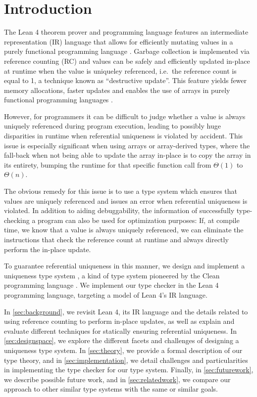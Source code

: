 \chapter{Introduction}\label{sec:intro}

The Lean 4 theorem prover and programming language \citep{de_moura_lean_2021} features an intermediate representation (IR) language that allows for efficiently mutating values in a purely functional programming language \citep{ullrich_counting_2020}. Garbage collection is implemented via reference counting (RC) and values can be safely and efficiently updated in-place at runtime when the value is uniqueley referenced, i.e.\ the reference count is equal to 1, a technique known as ``destructive update''. This feature yields fewer memory allocations, faster updates and enables the use of arrays in purely functional programming languages \citep{ullrich_counting_2020}.

However, for programmers it can be difficult to judge whether a value is always uniquely referenced during program execution, leading to possibly huge disparities in runtime when referential uniqueness is violated by accident. This issue is especially significant when using arrays or array-derived types, where the fall-back when not being able to update the array in-place is to copy the array in its entirety, bumping the runtime for that specific function call from $\Theta(1)$ to $\Theta(n)$.

The obvious remedy for this issue is to use a type system which ensures that values are uniquely referenced and issues an error when referential uniqueness is violated. In addition to aiding debuggability, the information of successfully type-checking a program can also be used for optimization purposes: If, at compile time, we know that a value is always uniquely referenced, we can eliminate the instructions that check the reference count at runtime and always directly perform the in-place update.

To guarantee referential uniqueness in this manner, we design and implement a uniqueness type system \citep{sergey_linearity_2022}, a kind of type system pioneered by the Clean programming language \citep{smetsers_guaranteeing_1994}. We implement our type checker in the Lean 4 programming language, targeting a model of Lean 4's IR language.

In \cref{sec:background}, we revisit Lean 4, its IR language and the details related to using reference counting to perform in-place updates, as well as explain and evaluate different techniques for statically ensuring referential uniqueness. In \cref{sec:designspace}, we explore the different facets and challenges of designing a uniqueness type system. In \cref{sec:theory}, we provide a formal description of our type theory, and in \cref{sec:implementation}, we detail challenges and particularities in implementing the type checker for our type system. Finally, in \cref{sec:futurework}, we describe possible future work, and in \cref{sec:relatedwork}, we compare our approach to other similar type systems with the same or similar goals.